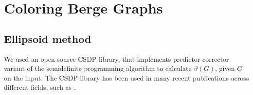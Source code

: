 





\section{Coloring Berge Graphs}

\subsection{Ellipsoid method}

We used an open source CSDP \cite{csdpRepo, csdp1999} library, that implements predictor corrector variant of the semidefinite programming algorithm to calculate $\vartheta(G)$, given $G$ on the input. The CSDP library has been used in many recent publications across different fields, such as \cite{Ampountolas_2017, Adasme_2011}.

